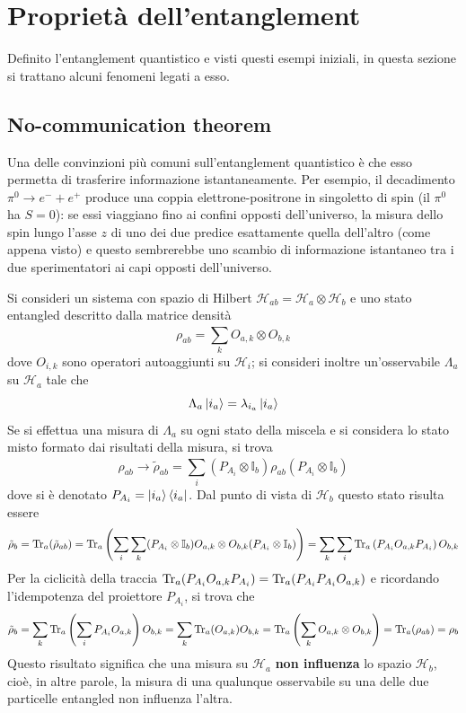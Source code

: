 \section{Proprietà dell'entanglement}
Definito l'entanglement quantistico e visti questi esempi iniziali, in questa sezione si trattano 
alcuni fenomeni legati a esso.
\subsection{No-communication theorem}
Una delle convinzioni più comuni sull'entanglement quantistico è che esso permetta di trasferire
informazione istantaneamente. Per esempio, il decadimento $\pi^0\rightarrow e^-+e^+$ produce una
coppia elettrone-positrone in singoletto di spin (il $\pi^0$ ha $S=0$): se essi viaggiano fino ai
confini opposti dell'universo, la misura dello spin lungo l'asse $z$ di uno dei due predice
esattamente quella dell'altro (come appena visto) e questo sembrerebbe uno scambio di informazione 
istantaneo tra i due sperimentatori ai capi opposti dell'universo.

Si consideri un sistema con spazio di Hilbert $\mathcal{H}_{ab}=\mathcal{H}_a\otimes\mathcal{H}_b$ e
uno stato entangled descritto dalla matrice densità
$$\rho_{ab}=\sum_{k}^{}O_{a,k}\otimes O_{b,k}$$
dove $O_{i,k}$ sono operatori autoaggiunti su $\mathcal{H}_i$; si consideri inoltre un'osservabile
$\Lambda_a$ su $\mathcal{H}_a$ tale che
$$\Lambda_a\ket{i_a} = \lambda_{i_a}\ket{i_a}$$
Se si effettua una misura di $\Lambda_a$ su ogni stato della miscela e si considera lo stato misto
formato dai risultati della misura, si trova
$$\rho_{ab}\to\tilde\rho_{ab}=\sum_{i}^{}(P_{A_i}\otimes\mathbb{I}_b)\rho_{ab}
(P_{A_i}\otimes\mathbb{I}_b)$$
dove si è denotato $P_{A_i}=\ket{i_a}\bra{i_a}$.
Dal punto di vista di $\mathcal{H}_b$ questo stato risulta essere
$$\tilde\rho_b=\Tr_a(\tilde\rho_{ab}) = \Tr_a\left(\sum_{i}^{}\sum_{k}^{}
    (P_{A_i}\otimes\mathbb{I}_b)O_{a,k}\otimes O_{b,k}(P_{A_i}\otimes\mathbb{I}_b)\right)=
    \sum_{k}^{}\sum_{i}^{}\Tr_a\left(P_{A_i}O_{a,k}P_{A_i}\right)O_{b,k}
$$
Per la ciclicità della traccia $\Tr_a(P_{A_i}O_{a,k}P_{A_i})=\Tr_a(P_{A_i}P_{A_i}O_{a,k})$ e 
ricordando l'idempotenza del proiettore $P_{A_i}$, si trova che
$$\tilde\rho_b=\sum_{k}^{}\Tr_a\left(\sum_{i}^{}P_{A_i}O_{a,k}\right)O_{b,k}=
\sum_{k}^{}\Tr_a(O_{a,k})O_{b,k}=\Tr_a\left(\sum_{k}^{}O_{a,k}\otimes O_{b,k}\right)=\Tr_a(\rho_{ab})=
\rho_b$$
Questo risultato significa che una misura su $\mathcal{H}_a$ \textbf{non influenza} lo spazio
$\mathcal{H}_b$, cioè, in altre parole, la misura di una qualunque osservabile su una delle due
particelle entangled non influenza l'altra.
